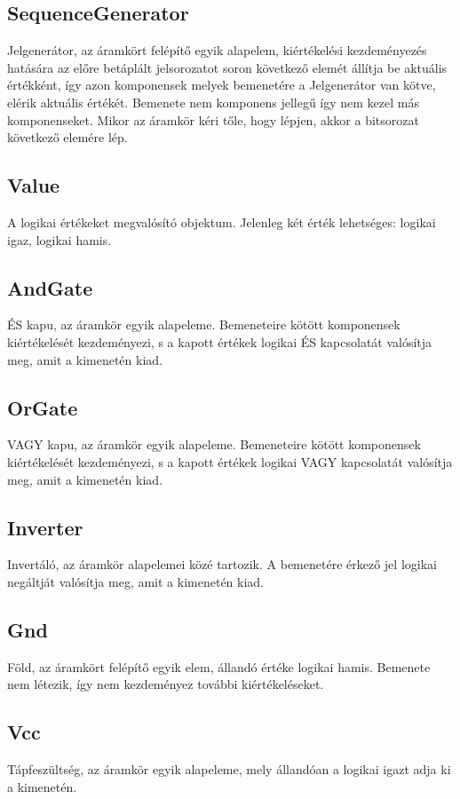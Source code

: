 \subsection{\bf SequenceGenerator}
Jelgenerátor, az áramkört felépítő egyik alapelem, kiértékelési kezdeményezés hatására az előre betáplált jelsorozatot soron következő elemét állítja be aktuális értékként, így azon komponensek melyek bemenetére a Jelgenerátor van kötve, elérik aktuális értékét. Bemenete nem komponens jellegű így nem kezel más komponenseket. Mikor az áramkör kéri tőle, hogy lépjen, akkor a bitsorozat következő elemére lép.

\subsection{\bf Value}
A logikai értékeket megvalósító objektum. Jelenleg két érték lehetséges: logikai igaz, logikai hamis.

\subsection{\bf AndGate}
ÉS kapu, az áramkör egyik alapeleme. Bemeneteire kötött komponensek kiértékelését kezdeményezi, s a kapott értékek logikai ÉS kapcsolatát valósítja meg, amit a kimenetén kiad.

\subsection{\bf OrGate}
VAGY kapu, az áramkör egyik alapeleme. Bemeneteire kötött komponensek kiértékelését kezdeményezi, s a kapott értékek logikai VAGY kapcsolatát valósítja meg, amit a kimenetén kiad.

\subsection{\bf Inverter}
Invertáló, az áramkör alapelemei közé tartozik. A bemenetére érkező jel logikai negáltját valósítja meg, amit a kimenetén kiad.

\subsection{\bf Gnd}
Föld, az áramkört felépítő egyik elem, állandó értéke logikai hamis. Bemenete nem létezik, így nem kezdeményez további kiértékeléseket.

\subsection{\bf Vcc}
Tápfeszültség, az áramkör egyik alapeleme, mely állandóan a logikai igazt adja ki a kimenetén.

